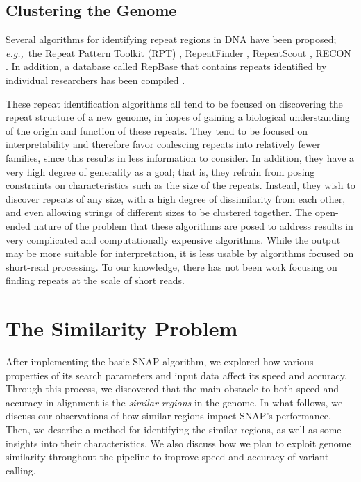 \documentclass[twocolumn,10pt]{article}
\newcommand{\eg}{{\em e.g.,}~}
\begin{document}
\subsection{Clustering the Genome}
\label{section:clusteringTheGenome}

Several algorithms for identifying repeat regions in DNA have been proposed; \eg the Repeat Pattern Toolkit (RPT) \cite{Agarwal:1994}, RepeatFinder \cite{Volfovsky:2001}, RepeatScout \cite{Price:2005}, RECON \cite{Bao:2002}.  In addition, a database called RepBase that contains repeats identified by individual researchers has been compiled \cite{Jurka:2005}.

These repeat identification algorithms all tend to be focused on discovering the repeat structure of a new genome, in hopes of gaining a biological understanding of the origin and function of these repeats.  They tend to be focused on interpretability and therefore favor coalescing repeats into relatively fewer families, since this results in less information to consider.  In addition, they have a very high degree of generality as a goal; that is, they refrain from posing constraints on characteristics such as the size of the repeats.  Instead, they wish to discover repeats of any size, with a high degree of dissimilarity from each other, and even allowing strings of different sizes to be clustered together.  The open-ended nature of the problem that these algorithms are posed to address results in very complicated and computationally expensive algorithms.  While the output may be more suitable for interpretation, it is less usable by algorithms focused on short-read processing.  To our knowledge, there has not been work focusing on finding repeats at the scale of short reads.

\section{The Similarity Problem}
\label{section:similarityProblem}

After implementing the basic SNAP algorithm, we explored how various properties of its search parameters and input data affect its speed and accuracy.  Through this process, we discovered that the main obstacle to both speed and accuracy in alignment is the \textit{similar regions} in the genome.  In what follows, we discuss our observations of how similar regions impact SNAP's performance.  Then, we describe a method for identifying the similar regions, as well as some insights into their characteristics.  We also discuss how we plan to exploit genome similarity throughout the pipeline to improve speed and accuracy of variant calling.
\end{document}
